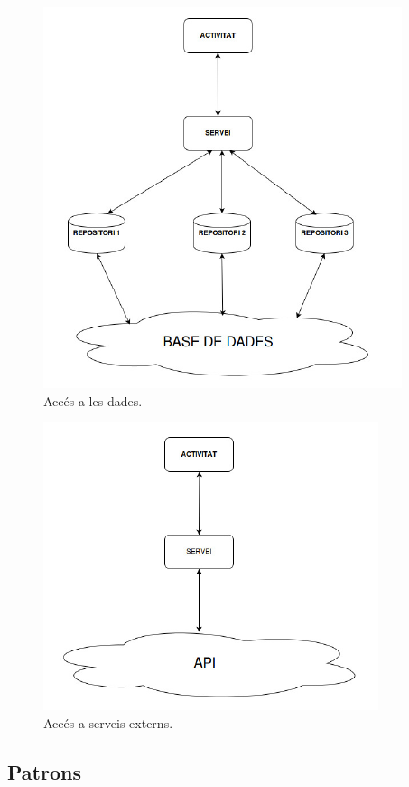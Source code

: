 \begin{itemize}
\begin{figure}[!h]
\centering
\includegraphics[scale=0.6]{Figures/AccesBD.jpg}
\caption{Accés a les dades.}
\end{figure}

\begin{figure}[!h]
\centering
\includegraphics[scale=0.7]{Figures/AccesAPI.jpg}
\caption{Accés a serveis externs.}
\end{figure}

\clearpage

\end{itemize}


\subsection{Patrons}

